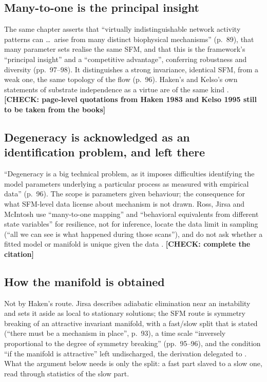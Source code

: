 \documentclass[10pt]{article}
\newcommand{\CHECK}[1]{\textcolor{purple!70!black}{\textbf{[CHECK: #1]}}}
\begin{document}
\subsection{Many-to-one is the principal insight}
The same chapter asserts that ``virtually indistinguishable network activity patterns can \ldots\ arise from many distinct biophysical mechanisms'' (p.~89), that many parameter sets realise the same SFM, and that this is the framework's ``principal insight'' and a ``competitive advantage'', conferring robustness and diversity (pp.~97--98). It distinguishes a strong invariance, identical SFM, from a weak one, the same topology of the flow (p.~96). Haken's and Kelso's own statements of substrate independence as a virtue are of the same kind \parencite{haken1980,kelso1995}. \CHECK{page-level quotations from Haken 1983 and Kelso 1995 still to be taken from the books}

\subsection{Degeneracy is acknowledged as an identification problem, and left there}
``Degeneracy is a big technical problem, as it imposes difficulties identifying the model parameters underlying a particular process as measured with empirical data'' (p.~96). The scope is parameters given behaviour; the consequence for what SFM-level data license about mechanism is not drawn. Ross, Jirsa and McIntosh use ``many-to-one mapping'' and ``behavioral equivalents from different state variables'' for resilience, not for inference, locate the data limit in sampling (``all we can see is what happened during those scans''), and do not ask whether a fitted model or manifold is unique given the data \parencite{ross2025}. \CHECK{complete the citation}

\subsection{How the manifold is obtained}
Not by Haken's route. Jirsa describes adiabatic elimination near an instability and sets it aside as local to stationary solutions; the SFM route is symmetry breaking of an attractive invariant manifold, with a fast/slow split that is stated (``there must be a mechanism in place'', p.~93), a time scale ``inversely proportional to the degree of symmetry breaking'' (pp.~95--96), and the condition ``if the manifold is attractive'' left undischarged, the derivation delegated to \textcite{pillai2017}. What the argument below needs is only the split: a fast part slaved to a slow one, read through statistics of the slow part.
\end{document}
